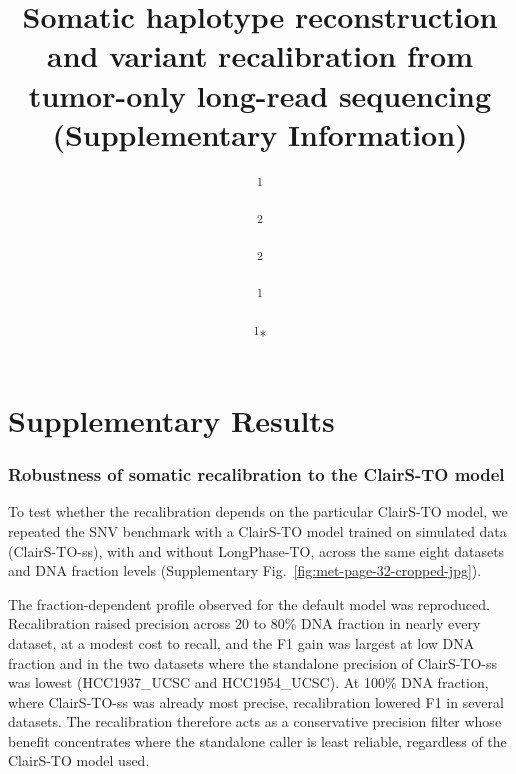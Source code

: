 \documentclass[pdflatex,sn-nature]{sn-jnl}
\begin{document}
\title{Somatic haplotype reconstruction and variant recalibration from tumor-only long-read sequencing (Supplementary Information)}

\author{ \textsuperscript{1}}
\author{ \textsuperscript{2}}
\author{ \textsuperscript{2}}
\author{ \textsuperscript{1}}
\author*{ \textsuperscript{1}*}


\maketitle

\tableofcontents

\listoffigures

\listoftables
\clearpage

\section{Supplementary Results}

\subsubsection*{Robustness of somatic recalibration to the ClairS-TO model}\label{characterization-of-the-precision-recall-trade-off-using-simulation-trained-models}

To test whether the recalibration depends on the particular ClairS-TO model, we repeated the SNV benchmark with a ClairS-TO model trained on simulated data (ClairS-TO-ss), with and without LongPhase-TO, across the same eight datasets and DNA fraction levels (Supplementary Fig.~\ref{fig:met-page-32-cropped-jpg}).

The fraction-dependent profile observed for the default model was reproduced. Recalibration raised precision across 20 to 80\% DNA fraction in nearly every dataset, at a modest cost to recall, and the F1 gain was largest at low DNA fraction and in the two datasets where the standalone precision of ClairS-TO-ss was lowest (HCC1937\_UCSC and HCC1954\_UCSC). At 100\% DNA fraction, where ClairS-TO-ss was already most precise, recalibration lowered F1 in several datasets. The recalibration therefore acts as a conservative precision filter whose benefit concentrates where the standalone caller is least reliable, regardless of the ClairS-TO model used.
\end{document}
